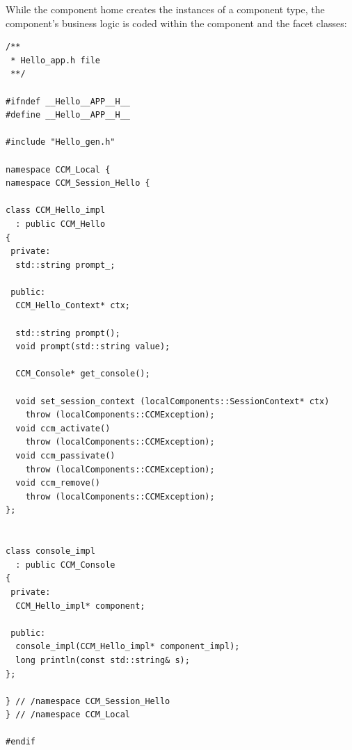 \noindent
While the component home creates the instances of a component type, the component's 
business logic is coded within the component and the facet classes:

\begin{small}
\begin{verbatim}
/**
 * Hello_app.h file
 **/

#ifndef __Hello__APP__H__
#define __Hello__APP__H__

#include "Hello_gen.h"

namespace CCM_Local {
namespace CCM_Session_Hello {

class CCM_Hello_impl
  : public CCM_Hello
{
 private:
  std::string prompt_;

 public:
  CCM_Hello_Context* ctx;

  std::string prompt();
  void prompt(std::string value);

  CCM_Console* get_console();

  void set_session_context (localComponents::SessionContext* ctx)
    throw (localComponents::CCMException);
  void ccm_activate()
    throw (localComponents::CCMException);
  void ccm_passivate()
    throw (localComponents::CCMException);
  void ccm_remove()
    throw (localComponents::CCMException);
};


class console_impl
  : public CCM_Console
{
 private:
  CCM_Hello_impl* component;

 public:
  console_impl(CCM_Hello_impl* component_impl);
  long println(const std::string& s);
};

} // /namespace CCM_Session_Hello
} // /namespace CCM_Local

#endif
\end{verbatim}
\end{small}


